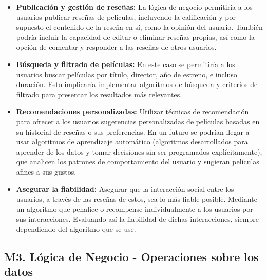 \begin{itemize}
\item \textbf{Publicación y gestión de reseñas:} La lógica de negocio permitiría a los usuarios publicar reseñas de películas, incluyendo la calificación y por supuesto el contenido de la reseña en sí, como la opinión del usuario. También podría incluir la capacidad de editar o eliminar reseñas propias, así como la opción de comentar y responder a las reseñas de otros usuarios.
\item \textbf{Búsqueda y filtrado de películas:} En este caso se permitiría a los usuarios buscar películas por título, director, año de estreno, e incluso duración. Esto implicaría implementar algoritmos de búsqueda y criterios de filtrado para presentar los resultados más relevantes. 
\item \textbf{Recomendaciones personalizadas:} Utilizar técnicas de recomendación para ofrecer a los usuarios sugerencias personalizadas de películas basadas en su historial de reseñas o sus preferencias. En un futuro se podrían llegar a usar algoritmos de aprendizaje automático (algoritmos desarrollados para aprender de los datos y tomar decisiones sin ser programados explícitamente), que analicen los patrones de comportamiento del usuario y sugieran películas afines a sus gustos.
\item \textbf{Asegurar la fiabilidad:} Asegurar que la interacción social entre los usuarios, a través de las reseñas de estos, sea lo más fiable posible. Mediante un algoritmo que penalice o recompense individualmente a los usuarios por sus interacciones. Evaluando así la fiabilidad de dichas interacciones, siempre dependiendo del algoritmo que se use.
\end{itemize}

\subsection{M3. Lógica de Negocio - Operaciones sobre los datos}